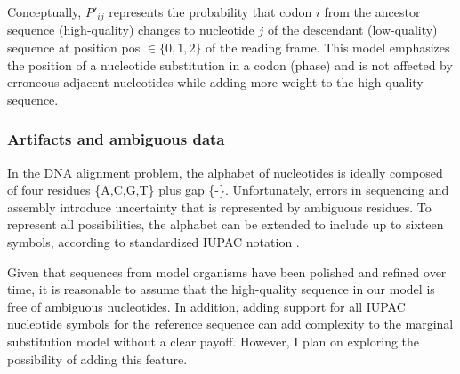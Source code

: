 Conceptually, $P'_{ij}$ represents the probability that codon $i$ from the
ancestor sequence (high-quality) changes to nucleotide $j$ of the descendant
(low-quality) sequence at position pos $\in \{0,1,2\}$ of the reading frame.
This model emphasizes the position of a nucleotide substitution in a codon
(phase) and is not affected by erroneous adjacent nucleotides while adding more
weight to the high-quality sequence.


\subsubsection{Artifacts and ambiguous data}



In the DNA alignment problem, the alphabet of nucleotides is ideally composed
of four residues \{A,C,G,T\} plus gap \{-\}.
Unfortunately, errors in sequencing and assembly introduce uncertainty that is
represented by ambiguous residues.
To represent all possibilities, the alphabet can be extended to include up to
sixteen symbols, according to standardized IUPAC notation
\parencite{cornish_1985_nomenclature}.


Given that sequences from model organisms have been polished and refined over
time, it is reasonable to assume that the high-quality sequence in our model is
free of ambiguous nucleotides.
In addition, adding support for all IUPAC nucleotide symbols for the reference
sequence can add complexity to the marginal substitution model without a clear
payoff.
However, I plan on exploring the possibility of adding this feature.

